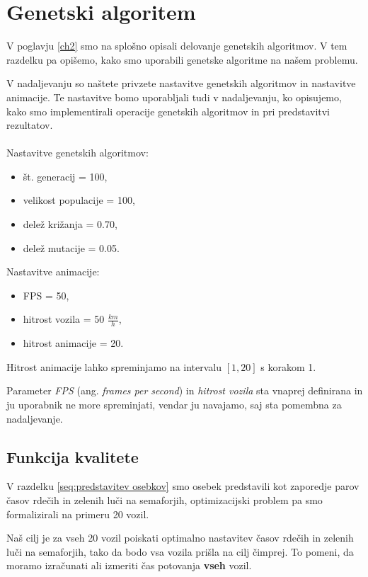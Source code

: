 \documentclass[a4paper, 12pt]{book}
\begin{document}
\section{Genetski algoritem}
\label{seq:nastavitve parametrov}
V poglavju \ref{ch2} smo na splo\v sno opisali delovanje genetskih algoritmov. V tem razdelku pa opi\v semo, kako smo uporabili genetske algoritme na na\v sem problemu.

V nadaljevanju so na\v stete privzete nastavitve genetskih algoritmov in nastavitve animacije. Te nastavitve bomo uporabljali tudi v nadaljevanju, ko opisujemo, kako smo implementirali operacije genetskih algoritmov in pri predstavitvi rezultatov.\\\\
Nastavitve genetskih algoritmov:
\begin{itemize}
\item \v st. generacij = 100,
\item velikost populacije = 100,
\item dele\v z kri\v zanja = 0.70,
\item dele\v z mutacije = 0.05.
\end{itemize}
Nastavitve animacije:
\begin{itemize}
\item FPS = 50,
\item hitrost vozila = 50 $\frac{km}{h}$,
\item hitrost animacije = 20.
\end{itemize}
Hitrost animacije lahko spreminjamo na intervalu $[1, 20]$ s korakom 1.

Parameter \textit{FPS} (ang. \textit{frames per second}) in \textit{hitrost vozila} sta vnaprej definirana in ju uporabnik ne more spreminjati, vendar ju navajamo, saj sta pomembna za nadaljevanje.

\subsection{Funkcija kvalitete}
V razdelku \ref{seq:predstavitev osebkov} smo osebek predstavili kot zaporedje parov \v casov rde\v cih in zelenih lu\v ci na semaforjih, optimizacijski problem pa smo formalizirali na primeru 20 vozil.

Na\v s cilj je za vseh 20 vozil poiskati optimalno nastavitev \v casov rde\v cih in zelenih lu\v ci na semaforjih, tako da bodo vsa vozila pri\v sla na cilj \v cimprej. To pomeni, da moramo izra\v cunati ali izmeriti \v cas potovanja \textbf{vseh} vozil.
\end{document}
